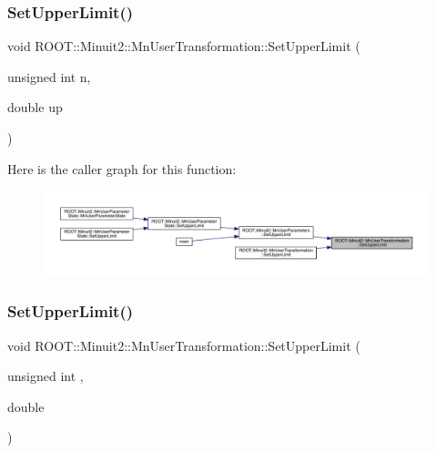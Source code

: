 \mbox{\label{classROOT_1_1Minuit2_1_1MnUserTransformation_a276c83d584ef857cd2b69ecc04cfab01}} 
\subsubsection{\texorpdfstring{SetUpperLimit()}{SetUpperLimit()}\hspace{0.1cm}{\footnotesize\ttfamily [2/6]}}
{\footnotesize\ttfamily void R\+O\+O\+T\+::\+Minuit2\+::\+Mn\+User\+Transformation\+::\+Set\+Upper\+Limit (\begin{DoxyParamCaption}\item[{unsigned int}]{n,  }\item[{double}]{up }\end{DoxyParamCaption})}

Here is the caller graph for this function\+:
\nopagebreak
\begin{figure}[H]
\begin{center}
\leavevmode
\includegraphics[width=350pt]{d9/d98/classROOT_1_1Minuit2_1_1MnUserTransformation_a276c83d584ef857cd2b69ecc04cfab01_icgraph}
\end{center}
\end{figure}
\mbox{\label{classROOT_1_1Minuit2_1_1MnUserTransformation_a276c83d584ef857cd2b69ecc04cfab01}} 
\subsubsection{\texorpdfstring{SetUpperLimit()}{SetUpperLimit()}\hspace{0.1cm}{\footnotesize\ttfamily [3/6]}}
{\footnotesize\ttfamily void R\+O\+O\+T\+::\+Minuit2\+::\+Mn\+User\+Transformation\+::\+Set\+Upper\+Limit (\begin{DoxyParamCaption}\item[{unsigned int}]{,  }\item[{double}]{ }\end{DoxyParamCaption})}

